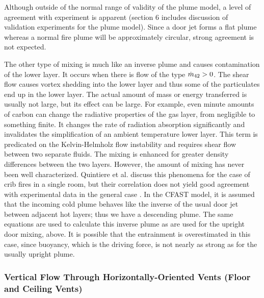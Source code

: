 Although outside of the normal range of validity of the plume model, a level of agreement with experiment is apparent (section 6 includes discussion of validation experiments for the plume model).  Since a door jet forms a flat plume whereas a normal fire plume will be approximately circular, strong agreement is not expected.

The other type of mixing is much like an inverse plume and causes contamination of the lower layer.  It occurs when there is flow of the type $\dot{m}_{42} > 0$.  The shear flow causes vortex shedding into the lower layer and thus some of the particulates end up in the lower layer.  The actual amount of mass or energy transferred is usually not large, but its effect can be large.  For example, even minute amounts of carbon can change the radiative properties of the gas layer, from negligible to something finite.  It changes the rate of radiation absorption significantly and invalidates the simplification of an ambient temperature lower layer.  This term is predicated on the Kelvin-Helmholz flow instability and requires shear flow between two separate fluids.  The mixing is enhanced for greater density differences between the two layers. However, the amount of mixing has never been well characterized. Quintiere et al. \cite{Quintiere:1984} discuss this phenomena for the case of crib fires in a single room, but their correlation does not yield good agreement with experimental data in the general case \cite{Quintiere:1981}.  In the CFAST model, it is assumed that the incoming cold plume behaves like the inverse of the usual door jet between adjacent hot layers; thus we have a descending plume.  The same equations are used to calculate this inverse plume as are used for the upright door mixing, above. It is possible that the entrainment is overestimated in this case, since buoyancy, which is the driving force, is not nearly as strong as for the usually upright plume.

\subsubsection{Vertical Flow Through Horizontally-Oriented Vents (Floor and Ceiling Vents)}

